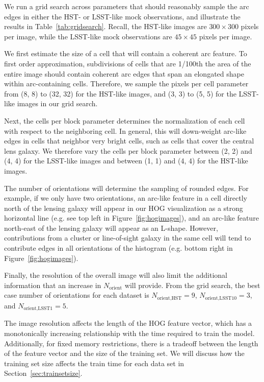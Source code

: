 \documentclass{emulateapj}
\begin{document}
We run a grid search across parameters that should reasonably sample
the arc edges in either the HST- or LSST-like mock observations, and
illustrate the results in Table~\ref{tab:gridsearch}.  Recall, the
HST-like images are $300\times300$ pixels per image, while the
LSST-like mock observations are $45\times45$ pixels per image.

We first estimate the size of a cell that will contain a coherent arc
feature.  To first order approximation, subdivisions of cells that are
1/100th the area of the entire image should contain coherent arc edges
that span an elongated shape within arc-containing cells.  Therefore,
we sample the pixels per cell parameter from (8, 8) to (32, 32) for
the HST-like images, and (3, 3) to (5, 5) for the LSST-like images in
our grid search.

Next, the cells per block parameter determines the normalization of
each cell with respect to the neighboring cell.  In general, this will
down-weight arc-like edges in cells that neighbor very bright cells,
such as cells that cover the central lens galaxy.  We therefore vary
the cells per block parameter between (2, 2) and (4, 4) for the
LSST-like images and between (1, 1) and (4, 4) for the HST-like
images.

The number of orientations will determine the sampling of rounded
edges.  For example, if we only have two orientations, an arc-like
feature in a cell directly north of the lensing galaxy will appear in
our HOG visualization as a strong horizontal line (e.g. see top left
in Figure~\ref{fig:hogimages}), and an arc-like feature north-east of
the lensing galaxy will appear as an L-shape.  However, contributions
from a cluster or line-of-sight galaxy in the same cell will tend to
contribute edges in all orientations of the histogram (e.g. bottom
right in Figure~\ref{fig:hogimages}).  

Finally, the resolution of the overall image will also limit the
additional information that an increase in $N_\text{orient}$ will
provide.  From the grid search, the best case number of orientations
for each dataset is $N_\text{orient,HST}=9$,
$N_\text{orient,LSST10}=3$, and $N_\text{orient,LSST1}=5$.

The image resolution affects the length of the HOG feature vector,
which has a monotonically increasing relationship with the time
required to train the model.  Additionally, for fixed memory
restrictions, there is a tradeoff between the length of the feature
vector and the size of the training set.  We will discuss how the
training set size affects the train time for each data set in
Section~\ref{sec:trainsetsize}.
\end{document}
